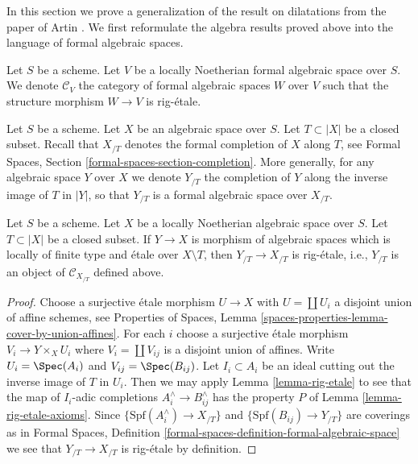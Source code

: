\noindent
In this section we prove a generalization of the result on dilatations
from the paper of Artin \cite{ArtinII}. We first reformulate the algebra
results proved above into the language of formal algebraic spaces.

\medskip\noindent
Let $S$ be a scheme. Let $V$ be a locally Noetherian formal algebraic space
over $S$. We denote $\mathcal{C}_V$ the category of formal algebraic
spaces $W$ over $V$ such that the structure morphism $W \to V$ is rig-\'etale.

\medskip\noindent
Let $S$ be a scheme. Let $X$ be an algebraic space over $S$.
Let $T \subset |X|$ be a closed subset. Recall that $X_{/T}$ denotes
the formal completion of $X$ along $T$, see 
Formal Spaces, Section \ref{formal-spaces-section-completion}.
More generally, for any algebraic space $Y$ over $X$ we
denote $Y_{/T}$ the completion of $Y$ along the inverse
image of $T$ in $|Y|$, so that $Y_{/T}$ is a formal algebraic space
over $X_{/T}$.

\begin{lemma}
\label{lemma-etale-gives-rig-etale}
Let $S$ be a scheme. Let $X$ be a locally Noetherian algebraic space over $S$.
Let $T \subset |X|$ be a closed subset. If $Y \to X$ is morphism of
algebraic spaces which is locally of finite type and \'etale over
$X \setminus T$, then $Y_{/T} \to X_{/T}$ is rig-\'etale, i.e., $Y_{/T}$
is an object of $\mathcal{C}_{X_{/T}}$ defined above.
\end{lemma}

\begin{proof}
Choose a surjective \'etale morphism $U \to X$ with $U = \coprod U_i$
a disjoint union of affine schemes, see Properties of Spaces, Lemma
\ref{spaces-properties-lemma-cover-by-union-affines}.
For each $i$ choose a surjective \'etale morphism $V_i \to Y \times_X U_i$
where $V_i = \coprod V_{ij}$ is a disjoint union of affines.
Write $U_i = \Spec(A_i)$ and $V_{ij} = \Spec(B_{ij})$.
Let $I_i \subset A_i$ be an ideal cutting out the inverse image
of $T$ in $U_i$. Then we may apply
Lemma \ref{lemma-rig-etale}
to see that the map of $I_i$-adic completions
$A_i^\wedge \to B_{ij}^\wedge$ has the property
$P$ of Lemma \ref{lemma-rig-etale-axioms}.
Since $\{\text{Spf}(A_i^\wedge) \to X_{/T}\}$ and
$\{\text{Spf}(B_{ij}) \to Y_{/T}\}$ are coverings as in
Formal Spaces, Definition
\ref{formal-spaces-definition-formal-algebraic-space}
we see that $Y_{/T} \to X_{/T}$ is rig-\'etale by definition.
\end{proof}

